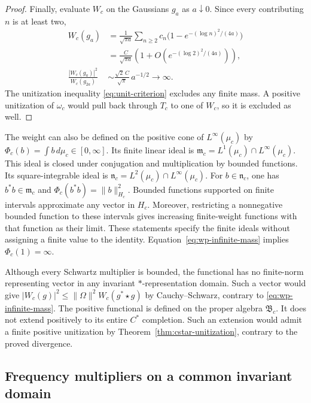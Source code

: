 \begin{proof}
Finally, evaluate $W_c$ on the Gaussians $g_a$ as $a\downarrow0$.
Since every contributing $n$ is at least two,
\begin{equation}
 \begin{aligned}
 W_c(g_a)&=\frac1{\sqrt{\pi a}}
       \sum_{n\geq2}c_n\bigl(1-e^{-(\log n)^2/(4a)}\bigr)\\
 &=\frac{C}{\sqrt{\pi a}}
       \left(1+O\left(e^{-(\log2)^2/(4a)}\right)\right),\\
 \frac{|W_c(g_a)|^2}{W_c(g_{2a})}
 &\sim\frac{\sqrt2\,C}{\sqrt\pi}\,a^{-1/2}\longrightarrow\infty.
 \end{aligned}
 \label{eq:wp-infinite-mass}
\end{equation}
The unitization inequality \eqref{eq:unit-criterion} excludes any finite mass.
A positive unitization of $\omega_c$ would pull back through $T_c$
to one of $W_c$, so it is excluded as well.
\end{proof}

The weight can also be defined on the positive cone of $L^\infty(\mu_c)$
by $\Phi_c(b)=\int b\,d\mu_c\in[0,\infty]$.
Its finite linear ideal is
$\mathfrak m_c=L^1(\mu_c)\cap L^\infty(\mu_c)$.
This ideal is closed under conjugation and multiplication by bounded functions.
Its square-integrable ideal is
$\mathfrak n_c=L^2(\mu_c)\cap L^\infty(\mu_c)$.
For $b\in\mathfrak n_c$, one has $b^*b\in\mathfrak m_c$ and
$\Phi_c(b^*b)=\|b\|_{H_c}^2$.
Bounded functions supported on finite intervals approximate any vector
in $H_c$.
Moreover, restricting a nonnegative bounded function to these intervals
gives increasing finite-weight functions with that function as their limit.
These statements specify the finite ideals without assigning a finite
value to the identity.
Equation~\eqref{eq:wp-infinite-mass} implies $\Phi_c(1)=\infty$.

Although every Schwartz multiplier is bounded, the functional has no
finite-norm representing vector in any invariant $*$-representation domain.
Such a vector would give
$|W_c(g)|^2\leq\|\Omega\|^2W_c(g^*\star g)$ by Cauchy--Schwarz,
contrary to \eqref{eq:wp-infinite-mass}.
The positive functional is defined on the proper algebra $\mathfrak B_c$.
It does not extend positively to its entire $C^*$ completion.
Such an extension would admit a finite positive unitization by
Theorem~\ref{thm:cstar-unitization}, contrary to the proved divergence.

\subsection{Frequency multipliers on a common invariant domain}

